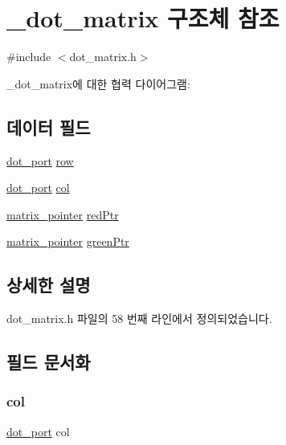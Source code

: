 \hypertarget{struct__dot__matrix}{}\section{\+\_\+dot\+\_\+matrix 구조체 참조}
\label{struct__dot__matrix}


{\ttfamily \#include $<$dot\+\_\+matrix.\+h$>$}



\+\_\+dot\+\_\+matrix에 대한 협력 다이어그램\+:
\subsection*{데이터 필드}
\begin{DoxyCompactItemize}
\item 
\hyperlink{dot__matrix_8h_a03f53cc8acae29f160b6cc647fa3db16}{dot\+\_\+port} \hyperlink{struct__dot__matrix_a549cd7f99fcdc1c15298e7a72ed1833e}{row}
\item 
\hyperlink{dot__matrix_8h_a03f53cc8acae29f160b6cc647fa3db16}{dot\+\_\+port} \hyperlink{struct__dot__matrix_a1ecc29bd3129a1772dc2497b384c71ec}{col}
\item 
\hyperlink{dot__matrix_8h_a5e6e638164edbbc5442305b37227e062}{matrix\+\_\+pointer} \hyperlink{struct__dot__matrix_a1a5469905d186f7dd9479561eb9ae6e2}{red\+Ptr}
\item 
\hyperlink{dot__matrix_8h_a5e6e638164edbbc5442305b37227e062}{matrix\+\_\+pointer} \hyperlink{struct__dot__matrix_ae24a27965d4b51bdc8068bc7a445ed68}{green\+Ptr}
\end{DoxyCompactItemize}


\subsection{상세한 설명}


dot\+\_\+matrix.\+h 파일의 58 번째 라인에서 정의되었습니다.



\subsection{필드 문서화}
\mbox{\label{struct__dot__matrix_a1ecc29bd3129a1772dc2497b384c71ec}} 
\subsubsection{\texorpdfstring{col}{col}}
{\footnotesize\ttfamily \hyperlink{dot__matrix_8h_a03f53cc8acae29f160b6cc647fa3db16}{dot\+\_\+port} col}



